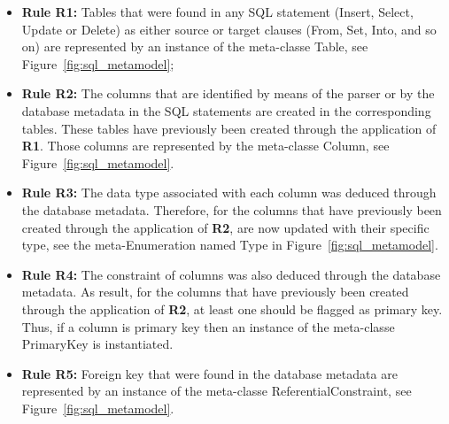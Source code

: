 \documentclass[a4paper,twoside]{article}
\begin{document}
\begin{itemize}

\item \textbf{Rule R1:} Tables that were found in any SQL statement (Insert, Select, Update or Delete) as either source or target clauses (From, Set, Into, and so on) are represented by an instance of the meta-classe Table, see Figure~\ref{fig:sql_metamodel};

\item \textbf{Rule R2:} The columns that are identified by means of the parser or by the database metadata in the SQL statements are created in the corresponding tables. These tables have previously been created through the application of \textbf{R1}. Those columns are represented by the meta-classe Column, see Figure~\ref{fig:sql_metamodel}.

\item \textbf{Rule R3:} The data type associated with each column was deduced through the database metadata. Therefore, for the columns that have previously been created through the application of \textbf{R2}, are now updated with their specific type, see the meta-Enumeration named Type in Figure~\ref{fig:sql_metamodel}.

\item \textbf{Rule R4:} The constraint of columns  was also deduced through the database metadata. As result, for the columns that have previously been created through the application of \textbf{R2}, at least one should be flagged as primary key. Thus, if a column is primary key then an instance of the meta-classe PrimaryKey is instantiated. 

\item \textbf{Rule R5:} Foreign key that were found in the database metadata are represented by an instance of the meta-classe ReferentialConstraint, see Figure~\ref{fig:sql_metamodel}.

\end{itemize}
\end{document}
